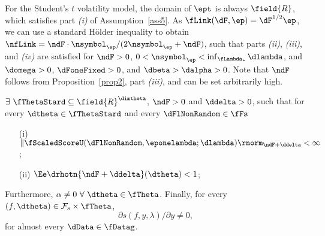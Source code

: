 
\begin{exmc} %
For the Student's $t$ volatility model, the domain of $\ept$ is always $\field{R}$, which satisfies part \textit{(i)} of Assumption~\ref{ass5}.
As $\fLink(\dF,\ep)=\dF^{1/2}\ep$, we can use a standard H\"older inequality to obtain $\nfLink=\ndF\cdot\nsymbol_\ep/(2\nsymbol_\ep+\ndF)$, such that parts \textit{(ii)}, \textit{(iii)}, and \textit{(iv)} are satisfied for $\ndF>0$, $0 < \nsymbol_\ep < \inf_{\fLambda_*} \dlambda$, and $\domega>0$, $\dFoneFixed>0$, and $\dbeta>\dalpha>0$.
Note that $\ndF$ follows from Proposition~\ref{prop2}, part \textit{(iii)}, and can be set arbitrarily high.
\end{exmc}



\begin{ass}
\label{ass6}
$\exists\ \fThetaStard \subseteq \field{R}^{\dimtheta}$, $\ndF 
> 0$ and $\ddelta>0$, such that for every $\dtheta \in 
\fThetaStard$ and every
$\dFlNonRandom \in \fFs$ %
\begin{enumerate}
    \item[(i)] $\| \fScaledScoreU(\dFlNonRandom,\eponelambda;\dlambda) \rnorm_{\ndF+\ddelta} < \infty$;
    \item[(ii)] $\Ee %
    \drhotn{\ndF+\ddelta}(\dtheta) < 1$;
\end{enumerate}
Furthermore, $  \alpha \neq 0 \ \forall \ \dtheta \in \fTheta$. Finally, for every $(f,\dtheta) \in \mathcal{F}_{s} \times \fTheta$, 
\begin{equation}
    \label{eq1ass6}
\partial s(f,y,\lambda)/ \partial y \neq 0, %
\end{equation}
for almost every $\dData \in \fDatag$.
\end{ass}


